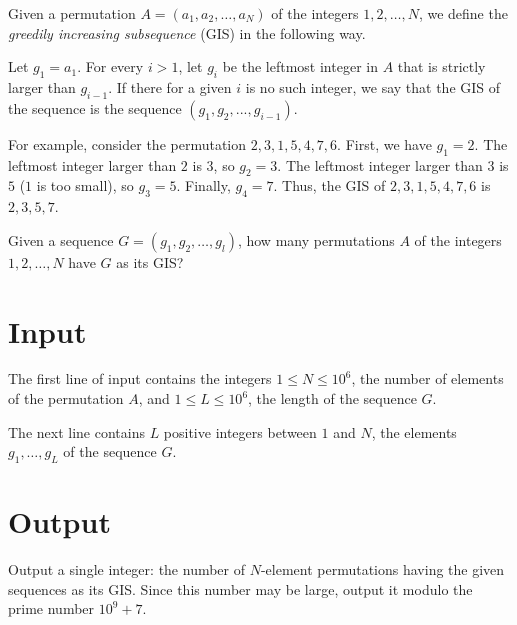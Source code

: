 Given a permutation $A = (a_1, a_2, \dots, a_N)$ of the integers $1, 2, \dots, N$, we define the \emph{greedily increasing subsequence} (GIS) in the following way.

Let $g_1 = a_1$. For every $i > 1$, let $g_i$ be the leftmost integer in $A$ that is strictly larger than $g_{i-1}$.
If there for a given $i$ is no such integer, we say that the GIS of the sequence is the sequence $(g_1, g_2, ..., g_{i - 1})$.

For example, consider the permutation $2, 3, 1, 5, 4, 7, 6$.
First, we have $g_1 = 2$.
The leftmost integer larger than $2$ is $3$, so $g_2 = 3$.
The leftmost integer larger than $3$ is $5$ ($1$ is too small), so $g_3 = 5$.
Finally, $g_4 = 7$.
Thus, the GIS of $2, 3, 1, 5, 4, 7, 6$ is $2, 3, 5, 7$.

Given a sequence $G = (g_1, g_2, \dots, g_l)$, how many permutations $A$ of the integers $1, 2, \dots, N$ have $G$ as its GIS?

\section*{Input}
The first line of input contains the integers $1 \le N \le 10^6$, the number of elements of the permutation $A$,
and $1 \le L \le 10^6$, the length of the sequence $G$.

The next line contains $L$ positive integers between $1$ and $N$, the elements $g_1, \dots, g_L$ of the sequence $G$.

\section*{Output}
Output a single integer: the number of $N$-element permutations having the given sequences as its GIS.
Since this number may be large, output it modulo the prime number $10^9 + 7$.
